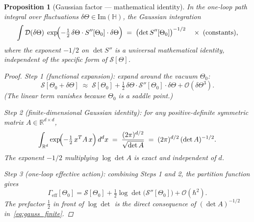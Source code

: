 \documentclass[11pt,a4paper]{article}
\newtheorem{proposition}{Proposition}
\theoremstyle{definition}
\theoremstyle{remark}
\begin{document}
\begin{proposition}[Gaussian factor — mathematical identity]
\label{prop:gaussian}
  In the one-loop path integral over fluctuations
  $\delta\Theta \in \mathrm{Im}(\mathbb{H})$,
  the Gaussian integration
  \begin{equation}
    \int \mathcal{D}(\delta\Theta)\;
      \exp\!\Bigl(-\tfrac{1}{2}\,\delta\Theta \cdot S''[\Theta_0] \cdot \delta\Theta\Bigr)
    \;=\; \bigl(\det S''[\Theta_0]\bigr)^{-1/2}
    \quad \times \;(\text{constants}),
    \label{eq:gaussian_path_integral}
  \end{equation}
  where the exponent $-1/2$ on $\det S''$ is a \emph{universal mathematical
  identity}, independent of the specific form of $\mathcal{S}[\Theta]$.
  \begin{proof}
    Step 1 (functional expansion):
    expand around the vacuum $\Theta_0$:
    \begin{equation}
      \mathcal{S}[\Theta_0 + \delta\Theta]
        \;\approx\; \mathcal{S}[\Theta_0]
        + \tfrac{1}{2}\,\delta\Theta \cdot \mathcal{S}''[\Theta_0] \cdot \delta\Theta
        + \mathcal{O}(\delta\Theta^3).
      \label{eq:action_expand}
    \end{equation}
    (The linear term vanishes because $\Theta_0$ is a saddle point.)

    Step 2 (finite-dimensional Gaussian identity):
    for any positive-definite symmetric matrix $A \in \mathbb{R}^{d\times d}$,
    \begin{equation}
      \int_{\mathbb{R}^d} \exp\!\Bigl(-\tfrac{1}{2}\,x^T A\, x\Bigr)\,d^d x
        \;=\; \frac{(2\pi)^{d/2}}{\sqrt{\det A}}
        \;=\; (2\pi)^{d/2}\,(\det A)^{-1/2}.
      \label{eq:gauss_finite}
    \end{equation}
    The exponent $-1/2$ multiplying $\log\det A$ is exact and independent of $d$.

    Step 3 (one-loop effective action):
    combining Steps 1 and 2, the partition function gives
    \begin{equation}
      \Gamma_{\mathrm{eff}}[\Theta_0]
        = \mathcal{S}[\Theta_0]
        + \tfrac{1}{2}\log\det\bigl(\mathcal{S}''[\Theta_0]\bigr)
        + \mathcal{O}(\hbar^2).
      \label{eq:Gamma_one_loop}
    \end{equation}
    The prefactor $\tfrac{1}{2}$ in front of $\log\det$ is the direct
    consequence of $(\det A)^{-1/2}$ in~\eqref{eq:gauss_finite}.
  \end{proof}
\end{proposition}
\end{document}
